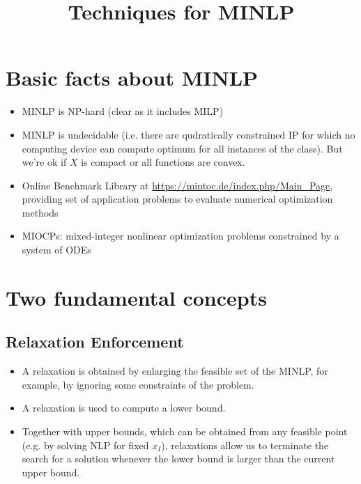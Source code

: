\documentclass{article}
\title{\textbf{Techniques for MINLP}}
\begin{document}
\maketitle

\section{Basic facts about MINLP}
\begin{itemize}
\item MINLP is NP-hard (clear as it includes MILP)
\item MINLP is undecidable (i.e. there are qudratically constrained IP for which no computing device can compute optimum for all instances of the class). But we're ok if $X$ is compact or all functions are convex.
\item Online Benchmark Library at \url{https://mintoc.de/index.php/Main_Page}, providing set of application problems to evaluate numerical optimization methods
\item MIOCPs: mixed-integer nonlinear optimization problems constrained by a system of ODEs
\end{itemize}

\section{Two fundamental concepts}
\subsection{Relaxation Enforcement}
\begin{itemize}
\item A relaxation is obtained by enlarging the feasible set of the MINLP, for example, by ignoring some constraints of the problem.
\item A relaxation is used to compute a lower bound. 
\item Together with upper bounds, which can be obtained from any feasible point (e.g. by solving NLP for fixed $x_I$), relaxations allow us to terminate the search for a solution whenever the lower bound is larger than the current upper bound.
\end{itemize}
\end{document}
